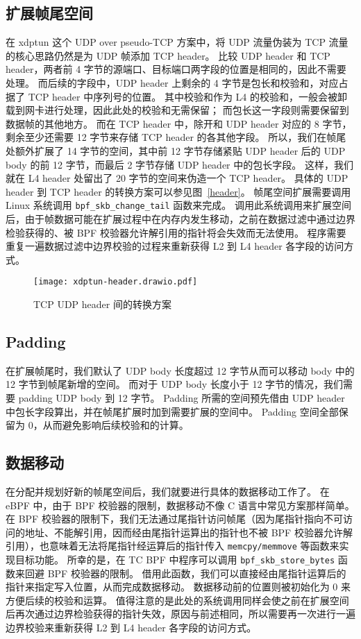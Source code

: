 \subsection{扩展帧尾空间}

在 xdptun 这个 UDP over pseudo-TCP 方案中，将 UDP 流量伪装为 TCP 流量的核心思路仍然是为 UDP 帧添加 TCP header。
比较 UDP header 和 TCP header，两者前 4 字节的源端口、目标端口两字段的位置是相同的，因此不需要处理。
而后续的字段中，UDP header 上剩余的 4 字节是包长和校验和，对应占据了 TCP header 中序列号的位置。
其中校验和作为 L4 的校验和，一般会被卸载到网卡进行处理，因此此处的校验和无需保留；
而包长这一字段则需要保留到数据帧的其他地方。
而在 TCP header 中，除开和 UDP header 对应的 8 字节，剩余至少还需要 12 字节来存储 TCP header 的各其他字段。
所以，我们在帧尾处额外扩展了 14 字节的空间，其中前 12 字节存储紧贴 UDP header 后的 UDP body 的前 12 字节，而最后 2 字节存储 UDP header 中的包长字段。
这样，我们就在 L4 header 处留出了 20 字节的空间来伪造一个 TCP header。
具体的 UDP header 到 TCP header 的转换方案可以参见图~\ref{header}。
帧尾空间扩展需要调用 Linux 系统调用 \texttt{bpf\_skb\_change\_tail} 函数来完成。
调用此系统调用来扩展空间后，由于帧数据可能在扩展过程中在内存内发生移动，之前在数据过滤中通过边界检验获得的、被 BPF 校验器允许解引用的指针将会失效而无法使用。
程序需要重复一遍数据过滤中边界校验的过程来重新获得 L2 到 L4 header 各字段的访问方式。

\begin{figure}[h]
  \centering
  \texttt{[image: xdptun-header.drawio.pdf]}
  \caption{TCP UDP header 间的转换方案}
  \label{fig:header}
\end{figure}

\subsection{Padding}

在扩展帧尾时，我们默认了 UDP body 长度超过 12 字节从而可以移动 body 中的 12 字节到帧尾新增的空间。
而对于 UDP body 长度小于 12 字节的情况，我们需要 padding UDP body 到 12 字节。
Padding 所需的空间预先借由 UDP header 中包长字段算出，并在帧尾扩展时加到需要扩展的空间中。
Padding 空间全部保留为 0，从而避免影响后续校验和的计算。

\subsection{数据移动}

在分配并规划好新的帧尾空间后，我们就要进行具体的数据移动工作了。
在 eBPF 中，由于 BPF 校验器的限制，数据移动不像 C 语言中常见方案那样简单。
在 BPF 校验器的限制下，我们无法通过尾指针访问帧尾（因为尾指针指向不可访问的地址、不能解引用，因而经由尾指针运算出的指针也不被 BPF 校验器允许解引用），也意味着无法将尾指针经运算后的指针传入 \texttt{memcpy/memmove} 等函数来实现目标功能。
所幸的是，在 TC BPF 中程序可以调用 \texttt{bpf\_skb\_store\_bytes} 函数来回避 BPF 校验器的限制。
借用此函数，我们可以直接经由尾指针运算后的指针来指定写入位置，从而完成数据移动。
数据移动前的位置则被初始化为 0 来方便后续的校验和运算。
值得注意的是此处的系统调用同样会使之前在扩展空间后再次通过边界检验获得的指针失效，原因与前述相同，所以需要再一次进行一遍边界校验来重新获得 L2 到 L4 header 各字段的访问方式。

